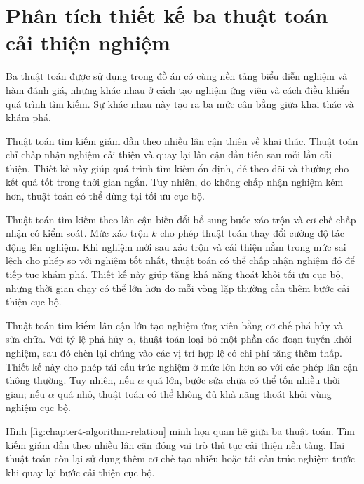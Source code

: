 \section{Phân tích thiết kế ba thuật toán cải thiện nghiệm}

Ba thuật toán được sử dụng trong đồ án có cùng nền tảng biểu diễn nghiệm và hàm đánh giá, nhưng khác nhau ở cách tạo nghiệm ứng viên và cách điều khiển quá trình tìm kiếm. Sự khác nhau này tạo ra ba mức cân bằng giữa khai thác và khám phá.

Thuật toán tìm kiếm giảm dần theo nhiều lân cận thiên về khai thác. Thuật toán chỉ chấp nhận nghiệm cải thiện và quay lại lân cận đầu tiên sau mỗi lần cải thiện. Thiết kế này giúp quá trình tìm kiếm ổn định, dễ theo dõi và thường cho kết quả tốt trong thời gian ngắn. Tuy nhiên, do không chấp nhận nghiệm kém hơn, thuật toán có thể dừng tại tối ưu cục bộ.

Thuật toán tìm kiếm theo lân cận biến đổi bổ sung bước xáo trộn và cơ chế chấp nhận có kiểm soát. Mức xáo trộn $k$ cho phép thuật toán thay đổi cường độ tác động lên nghiệm. Khi nghiệm mới sau xáo trộn và cải thiện nằm trong mức sai lệch cho phép so với nghiệm tốt nhất, thuật toán có thể chấp nhận nghiệm đó để tiếp tục khám phá. Thiết kế này giúp tăng khả năng thoát khỏi tối ưu cục bộ, nhưng thời gian chạy có thể lớn hơn do mỗi vòng lặp thường cần thêm bước cải thiện cục bộ.

Thuật toán tìm kiếm lân cận lớn tạo nghiệm ứng viên bằng cơ chế phá hủy và sửa chữa. Với tỷ lệ phá hủy $\alpha$, thuật toán loại bỏ một phần các đoạn tuyến khỏi nghiệm, sau đó chèn lại chúng vào các vị trí hợp lệ có chi phí tăng thêm thấp. Thiết kế này cho phép tái cấu trúc nghiệm ở mức lớn hơn so với các phép lân cận thông thường. Tuy nhiên, nếu $\alpha$ quá lớn, bước sửa chữa có thể tốn nhiều thời gian; nếu $\alpha$ quá nhỏ, thuật toán có thể không đủ khả năng thoát khỏi vùng nghiệm cục bộ.

Hình \ref{fig:chapter4-algorithm-relation} minh họa quan hệ giữa ba thuật toán. Tìm kiếm giảm dần theo nhiều lân cận đóng vai trò thủ tục cải thiện nền tảng. Hai thuật toán còn lại sử dụng thêm cơ chế tạo nhiễu hoặc tái cấu trúc nghiệm trước khi quay lại bước cải thiện cục bộ.

